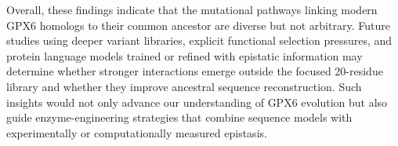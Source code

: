 Overall, these findings indicate that the mutational pathways linking modern GPX6 homologs to their common ancestor are diverse but not arbitrary. Future studies using deeper variant libraries, explicit functional selection pressures, and protein language models trained or refined with epistatic information may determine whether stronger interactions emerge outside the focused 20-residue library and whether they improve ancestral sequence reconstruction. Such insights would not only advance our understanding of GPX6 evolution but also guide enzyme-engineering strategies that combine sequence models with experimentally or computationally measured epistasis.\cite{Tran2026Science}
